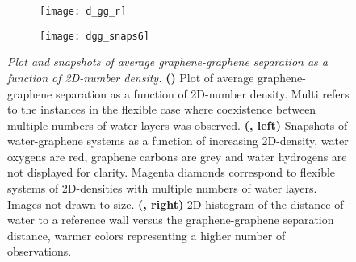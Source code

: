 \documentclass[12pt]{article}
\begin{document}
\begin{figure}[h!]
	\centering
	\begin{subfigure}[b]{0.49\textwidth}
    		\texttt{[image: d\_gg\_r]}
     		\caption{}
    		\label{fig:dgg_1}
  	\end{subfigure}
	\begin{subfigure}[b]{0.49\textwidth}
    		\texttt{[image: dgg\_snaps6]}
     		\caption{}
    		\label{fig:dgg_2}
  	\end{subfigure}
	\caption{\textit{Plot and snapshots of average graphene-graphene separation as a function of 2D-number density.} \textbf{(\protect{})} Plot of average graphene-graphene separation as a function of 2D-number density. Multi refers to the instances in the flexible case where coexistence between multiple numbers of water layers was observed. \textbf{(\protect{}, left)} Snapshots of water-graphene systems as a function of increasing 2D-density, water oxygens are red, graphene carbons are grey and water hydrogens are not displayed for clarity. Magenta diamonds correspond to flexible systems of 2D-densities with multiple numbers of water layers. Images not drawn to size. \textbf{(\protect{}, right)} 2D histogram of the distance of water to a reference wall versus the graphene-graphene separation distance, warmer colors representing a higher number of observations.}
	\label{fig:dgg}
\end{figure}
\end{document}
